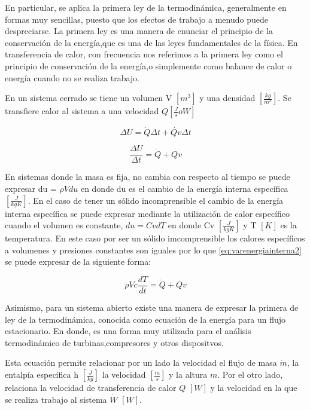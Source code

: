 \documentclass[12pt,letterpaper]{article}     %
\begin{document}
\cite[p\ 4]{Mills} En particular, se aplica la primera ley de la termodinámica, generalmente en formas muy sencillas, puesto que los efectos de trabajo a menudo puede despreciarse. La primera ley es una manera de enunciar el principio de la conservación de la energía,que es una de las leyes fundamentales de la física. En transferencia de calor, con frecuencia nos referimos a la primera ley como el principio de conservación de la energía,o simplemente como balance de calor o energía cuando no se realiza trabajo.


En un sistema cerrado se tiene un volumen V $[m^3]$ y una densidad $[\frac{kg}{m^3}]$. Se transfiere calor al sistema a una velocidad $\dot{Q}  [\frac{J}{s} o W]$

\begin{equation}
\Delta{U} = \dot{Q}\Delta t + \dot{Qv}\Delta t     
\label{eq:varenergiainterna}
\end{equation}

\begin{equation}
\frac{\Delta{U}}{\Delta t} = \dot{Q} + \dot{Qv}    
\label{eq:varenergiainterna2}
\end{equation}

En sistemas donde la masa es fija, no cambia con respecto al tiempo se puede expresar du = $ \rho V du $ en donde du es el cambio de la energía interna específica $[ \frac{J}{kgK}]$. En el caso de tener un sólido incomprensible el cambio de la energía interna específica se puede expresar mediante la utilización de calor específico cuando el volumen es constante, $du = Cv dT$ en donde Cv $[\frac{J}{kgK}]$ y T $[K]$ es la temperatura. En este caso por ser un sólido imcomprensible los calores específicos a volumenes y presiones  constantes son iguales por lo que \ref{eq:varenergiainterna2} se puede expresar de la siguiente forma:

\begin{equation}
\rho V c \frac{dT}{ dt} = \dot{Q} + \dot{Qv}    
\label{eq:cambiotemperatura}
\end{equation}

\cite[p\ 6]{Mills} Asimismo, para un sistema abierto existe una manera de expresar la primera de ley  de la termodinámica, conocida como ecuación de la energía para un flujo estacionario. En donde, es una forma muy utilizada para el análisis termodinámico de turbinas,compresores y otros dispositvos.

Esta ecuación permite relacionar por un lado la velocidad el flujo de masa $\dot{m}$, la entalpía específica h $[\frac{J}{kg}]$ la velocidad $[ \frac{m}{s} ]$ y la altura $m$. Por el otro lado, relaciona la velocidad de transferencia de calor $\dot{Q}$ $[W]$ y la velocidad en la que se realiza trabajo al sistema $\dot{W}$ $[W]$.
\end{document}
